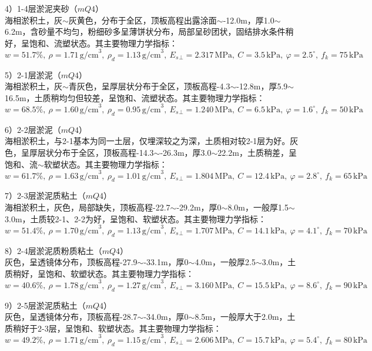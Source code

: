 \documentclass[UTF8, a4paper, 12pt]{ctexart} %
\begin{document}
\par 4）1-4层淤泥夹砂（$mQ4$）\\
海相淤积土，灰$\sim$灰黄色，分布于全区，顶板高程出露涂面$\sim$-12.0m，厚1.0$\sim$6.2m，含砂量不均匀，粉细砂多呈薄饼状分布，局部呈砂团状，固结排水条件稍好，呈饱和、流塑状态。其主要物理力学指标：
\[
w=51.7\%,\ \rho=1.71\, \text{g/cm}^3,\ \rho_d=1.13\, \text{g/cm}^3,\ E_s{_\perp}=2.317\, \text{MPa},\ C=3.5\, \text{kPa},\ \varphi=2.5^\circ,\ f_k=75\, \text{kPa}
\]

\par 5）2-1层淤泥（$mQ4$）\\
海相淤积土，灰$\sim$青灰色，呈厚层状分布于全区，顶板高程-4.3$\sim$-12.8m，厚5.9$\sim$16.5m，土质稍均匀但较差，呈饱和、流塑状态。其主要物理力学指标：
\[
w=68.5\%,\ \rho=1.60\, \text{g/cm}^3,\ \rho_d=0.95\, \text{g/cm}^3,\ E_s{_\perp}=1.240\, \text{MPa},\ C=6.5\, \text{kPa},\ \varphi=1.6^\circ,\ f_k=50\, \text{kPa}
\]

\par 6）2-2层淤泥（$mQ4$）\\
海相淤积土，与2-1基本为同一土层，仅埋深较之为深，土质相对较2-1层为好。灰色，呈厚层状分布于全区，顶板高程-14.3$\sim$-26.3m，厚3.0$\sim$22.2m，土质稍差，呈饱和、流$\sim$软塑状态。其主要物理力学指标：
\[
w=61.7\%,\ \rho=1.63\, \text{g/cm}^3,\ \rho_d=1.01\, \text{g/cm}^3,\ E_s{_\perp}=1.804\, \text{MPa},\ C=12.4\, \text{kPa},\ \varphi=2.8^\circ,\ f_k=65\, \text{kPa}
\]

\par 7）2-3层淤泥质粘土（$mQ4$）\\
海相淤积土，灰色，局部缺失，顶板高程-22.7$\sim$-29.2m，厚0$\sim$8.0m，一般厚1.5$\sim$3.0m，土质较2-1、2-2为好，呈饱和、软塑状态。其主要物理力学指标：
\[
w=51.4\%,\ \rho=1.70\, \text{g/cm}^3,\ \rho_d=1.13\, \text{g/cm}^3,\ E_s{_\perp}=1.707\, \text{MPa},\ C=14.1\, \text{kPa},\ \varphi=4.1^\circ,\ f_k=70\, \text{kPa}
\]

\par 8）2-4层淤泥质粉质粘土（$mQ4$）\\
灰色，呈透镜体分布，顶板高程-27.9$\sim$-33.1m，厚0$\sim$4.0m，一般厚2.5$\sim$3.0m，土质稍好，呈饱和、软塑状态。其主要物理力学指标：
\[
w=40.6\%,\ \rho=1.78\, \text{g/cm}^3,\ \rho_d=1.27\, \text{g/cm}^3,\ E_s{_\perp}=3.160\, \text{MPa},\ C=15.5\, \text{kPa},\ \varphi=8.6^\circ,\ f_k=90\, \text{kPa}
\]

\par 9）2-5层淤泥质粘土（$mQ4$）\\
灰色，呈透镜体分布，顶板高程-28.7$\sim$-34.0m，厚0$\sim$8.5m，一般厚大于2.0m，土质稍好于2-3层，呈饱和、软塑状态。其主要物理力学指标：
\[
w=49.2\%,\ \rho=1.71\, \text{g/cm}^3,\ \rho_d=1.15\, \text{g/cm}^3,\ E_s{_\perp}=2.606\, \text{MPa},\ C=15.7\, \text{kPa},\ \varphi=5.4^\circ,\ f_k=80\, \text{kPa}
\]
\end{document}
